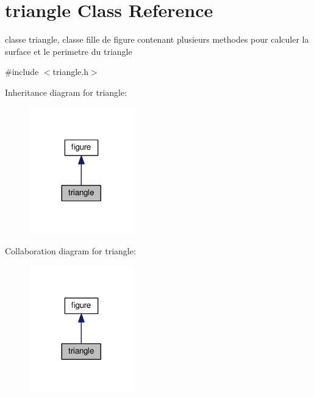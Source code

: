 \hypertarget{classtriangle}{}\section{triangle Class Reference}
\label{classtriangle}


classe triangle, classe fille de figure contenant plusieurs methodes pour calculer la surface et le perimetre du triangle  




{\ttfamily \#include $<$triangle.\+h$>$}



Inheritance diagram for triangle\+:\nopagebreak
\begin{figure}[H]
\begin{center}
\leavevmode
\includegraphics[width=128pt]{classtriangle__inherit__graph}
\end{center}
\end{figure}


Collaboration diagram for triangle\+:\nopagebreak
\begin{figure}[H]
\begin{center}
\leavevmode
\includegraphics[width=128pt]{classtriangle__coll__graph}
\end{center}
\end{figure}
